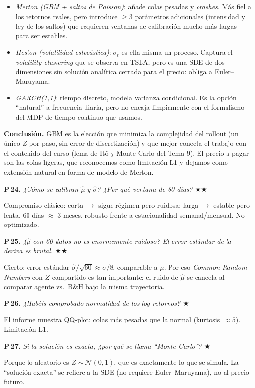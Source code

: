 \documentclass[11pt,a4paper]{article}
\newcommand{\preg}[2]{%
  \par\medskip
  \noindent\textbf{P\,#1.} \emph{#2}\par\smallskip}
\newcommand{\resp}[1]{%
  \noindent #1\par}
\begin{document}
{\begin{itemize}\setlength{\itemsep}{0pt}
  \item \emph{Merton (GBM + saltos de Poisson)}: añade colas pesadas y
        \emph{crashes}. Más fiel a los retornos reales, pero introduce
        $\geq 3$ parámetros adicionales (intensidad y ley de los saltos)
        que requieren ventanas de calibración mucho más largas para ser
        estables.
  \item \emph{Heston (volatilidad estocástica)}: $\sigma_t$ es ella misma
        un proceso. Captura el \emph{volatility clustering} que se
        observa en TSLA, pero es una SDE de dos dimensiones sin solución
        analítica cerrada para el precio: obliga a Euler--Maruyama.
  \item \emph{GARCH(1,1)}: tiempo discreto, modela varianza condicional.
        Es la opción ``natural'' a frecuencia diaria, pero no encaja
        limpiamente con el formalismo del MDP de tiempo continuo que
        usamos.
\end{itemize}

\smallskip
\textbf{Conclusión.} GBM es la elección que minimiza la complejidad del
rollout (un único $Z$ por paso, sin error de discretización) y que mejor
conecta el trabajo con el contenido del curso (lema de Itô y Monte Carlo
del Tema 9). El precio a pagar son las colas ligeras, que reconocemos
como limitación L1 y dejamos como extensión natural en forma de modelo
de Merton.}

\preg{24}{¿Cómo se calibran $\hat\mu$ y $\hat\sigma$? ¿Por qué ventana
de 60 días? \hfill$\bigstar\bigstar$}
\resp{%
Compromiso clásico: corta $\to$ sigue régimen pero ruidosa; larga $\to$
estable pero lenta. 60 días $\approx$ 3 meses, robusto frente a
estacionalidad semanal/mensual. No optimizado.}

\preg{25}{¿$\hat\mu$ con 60 datos no es enormemente ruidoso? El error
estándar de la deriva es brutal. \hfill$\bigstar\bigstar$}
\resp{%
Cierto: error estándar $\hat\sigma/\sqrt{60}\approx \sigma/8$, comparable
a $\mu$. Por eso \emph{Common Random Numbers} con $Z$ compartido es tan
importante: el ruido de $\hat\mu$ se cancela al comparar agente vs.\ B\&H
bajo la misma trayectoria.}

\preg{26}{¿Habéis comprobado normalidad de los log-retornos?
\hfill$\bigstar$}
\resp{%
El informe muestra QQ-plot: colas más pesadas que la normal
(kurtosis~$\approx 5$). Limitación L1.}

\preg{27}{Si la solución es exacta, ¿por qué se llama ``Monte Carlo''?
\hfill$\bigstar$}
\resp{%
Porque lo aleatorio es $Z\sim\mathcal{N}(0,1)$, que es exactamente lo que
se simula. La ``solución exacta'' se refiere a la SDE (no requiere
Euler--Maruyama), no al precio futuro.}
\end{document}
